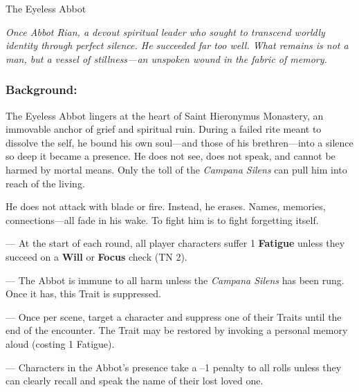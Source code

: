 \documentclass[nodeprecatedcode,bg=print]{dndbook/dndbook}
\begin{document}
\begin{WyrdFullNPC}[%
    name=The Eyeless Abbot,%
    description=Silence Incarnate,%
    float=!t%
  ]{The Eyeless Abbot}
  
  \emph{Once Abbot Rian, a devout spiritual leader who sought to transcend worldly identity through perfect silence. He succeeded far too well. What remains is not a man, but a vessel of stillness—an unspoken wound in the fabric of memory.}
  
  \subsubsection*{Background:}
  The Eyeless Abbot lingers at the heart of Saint Hieronymus Monastery, an immovable anchor of grief and spiritual ruin. During a failed rite meant to dissolve the self, he bound his own soul—and those of his brethren—into a silence so deep it became a presence. He does not see, does not speak, and cannot be harmed by mortal means. Only the toll of the \emph{Campana Silens} can pull him into reach of the living.
  
  He does not attack with blade or fire. Instead, he erases. Names, memories, connections—all fade in his wake. To fight him is to fight forgetting itself.
  
  \vspace{0.5\baselineskip}
  \SkillsBox[%
    expert={Will},%
    skilled={Focus, FIXME},%
    novice={FIXME, Awareness, Insight}%
  ]
  
  \begin{TraitsBox}
    \item[Silence Hungers] — At the start of each round, all player characters suffer 1 \textbf{Fatigue} unless they succeed on a \textbf{Will} or \textbf{Focus} check (TN 2).
    \item[Untouchable Form] — The Abbot is immune to all harm unless the \emph{Campana Silens} has been rung. Once it has, this Trait is suppressed.
    \item[Erase the Self] — Once per scene, target a character and suppress one of their Traits until the end of the encounter. The Trait may be restored by invoking a personal memory aloud (costing 1 Fatigue).
    \item[Aura of Dread] — Characters in the Abbot’s presence take a –1 penalty to all rolls unless they can clearly recall and speak the name of their lost loved one.
  \end{TraitsBox}

  \DamageBox
\end{WyrdFullNPC}
\end{document}
